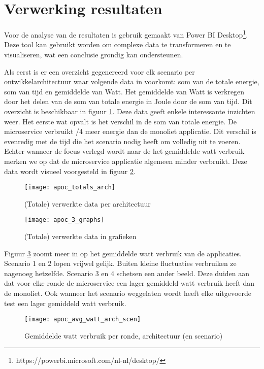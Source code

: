 \section{Verwerking resultaten}
Voor de analyse van de resultaten is gebruik gemaakt van Power BI Desktop\footnote{https://powerbi.microsoft.com/nl-nl/desktop/}. Deze tool kan gebruikt worden om complexe data te transformeren en te visualiseren, wat een conclusie grondig kan ondersteunen.

Als eerst is er een overzicht gegenereerd voor elk scenario per ontwikkelarchitectuur waar volgende data in voorkomt: som van de totale energie, som van tijd en gemiddelde van Watt. Het gemiddelde van Watt is verkregen door het delen van de som van totale energie in Joule door de som van tijd. Dit overzicht is beschikbaar in figuur \ref{apoc_totals_arch}. Deze data geeft enkele interessante inzichten weer. Het eerste wat opvalt is het verschil in de som van totale energie. De microservice verbruikt /4 meer energie dan de monoliet applicatie. Dit verschil is evenredig met de tijd die het scenario nodig heeft om volledig uit te voeren. Echter wanneer de focus verlegd wordt naar de het gemiddelde watt verbruik merken we op dat de microservice applicatie algemeen minder verbruikt. Deze data wordt visueel voorgesteld in figuur \ref{apoc_3_graphs}.\\
\begin{figure}[h!]
    \texttt{[image: apoc\_totals\_arch]}
    \centering
    \caption{(Totale) verwerkte data per architectuur}
    \label{apoc_totals_arch}
\end{figure}

\begin{figure}[h!]
    \texttt{[image: apoc\_3\_graphs]}
    \centering
    \caption{(Totale) verwerkte data in grafieken}
    \label{apoc_3_graphs}
\end{figure}


Figuur \ref{apoc_avg_watt_arch_scen} zoomt meer in op het gemiddelde watt verbruik van de applicaties. Scenario 1 en 2 lopen vrijwel gelijk. Buiten kleine fluctuaties verbruiken ze nagenoeg hetzelfde. Scenario 3 en 4 schetsen een ander beeld. Deze duiden aan dat voor elke ronde de microservice een lager gemiddeld watt verbruik heeft dan de monoliet. Ook wanneer het scenario weggelaten wordt heeft elke uitgevoerde test een lager gemiddeld watt verbruik.\\
\begin{figure}[h!]
    \texttt{[image: apoc\_avg\_watt\_arch\_scen]}
    \centering
    \caption{Gemiddelde watt verbruik per ronde, architectuur (en scenario)}
    \label{apoc_avg_watt_arch_scen}
\end{figure}


